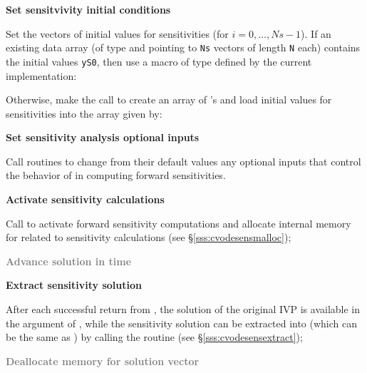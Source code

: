 \begin{Steps}
\item
  {\bf Set sensitvivity initial conditions}

  Set the  vectors  of  initial values
  for sensitivities (for $i=0,\ldots,Ns-1$). 
  If an existing data array  (of type  and pointing to
  {\tt Ns} vectors of length {\tt N} each) contains the initial values
  {\tt yS0}, then use a macro of type  defined by the current 
  {\nvector} implementation:

  {\s} 

  {\p} 

  Otherwise, make the call  
  to create an array of 's and load initial values for 
  sensitivities  into the array given by:

  {\s} 

  {\p} 
  
\item
  {\bf Set sensitivity analysis optional inputs}

  Call  routines to change from their default values any
  optional inputs that control the behavior of {\cvodes} in computing forward 
  sensitivities.

\item
  {\bf Activate sensitivity calculations}

  Call \id{(\ldots);} to activate forward 
  sensitivity computations and allocate internal
  memory for {\cvodes} related to sensitivity calculations
  (see \S\ref{sss:cvodesensmalloc});

\item
  \textcolor{gray}{\bf Advance solution in time}

\item
  {\bf Extract sensitivity solution}

  After each successful return from , the solution of the
  original IVP is available in the  argument of ,
  while the sensitivity solution can be extracted into  (which can 
  be the same as ) by calling the routine 
  (see \S\ref{sss:cvodesensextract});

\item
  \textcolor{gray}{\bf Deallocate memory for solution vector}


\end{Steps}
